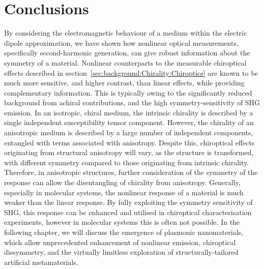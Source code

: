 \section{Conclusions}

By considering the electromagnetic behaviour of a medium within the electric dipole approximation, we have shown how nonlinear optical measurements, specifically second-harmonic generation, can give robust information about the symmetry of a material.
Nonlinear counterparts to the measurable chiroptical effects described in section~\ref{sec:background:Chirality:Chiroptics} are known to be much more sensitive, and higher contrast, than linear effects, while providing complementary information. This is typically owing to the significantly reduced background from achiral contributions, and the high symmetry-sensitivity of SHG emission.
In an isotropic, chiral medium, the intrinsic chirality is described by a single independent susceptibility tensor component. However, the chirality of an anisotropic medium is described by a large number of independent components, entangled with terms associated with anisotropy. 
Despite this, chiroptical effects originating from structural anisotropy will vary, as the structure is transformed, with different symmetry compared to those originating from intrinsic chirality.
Therefore, in anisotropic structures, further consideration of the symmetry of the response can allow the disentangling of chirality from anisotropy. 
Generally, especially in molecular systems, the nonlinear response of a material is much weaker than the linear response. By fully exploiting the symmetry sensitivity of SHG, this response can be enhanced and utilised in chiroptical characterisation experiments, however in molecular systems this is often not possible. In the following chapter, we will discuss the emergence of plasmonic nanomaterials, which allow unprecedented enhancement of nonlinear emission, chiroptical dissymmetry, and the virtually limitless exploration of structurally-tailored artificial metamaterials.
